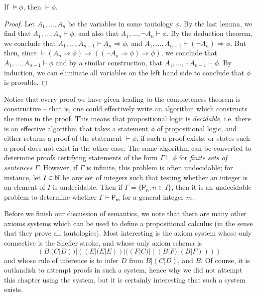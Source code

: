 \begin{corollary}
    If $\vDash \phi$, then $\vdash \phi$.
\end{corollary}
\begin{proof}
    Let $A_1, \dots, A_n$ be the variables in some tautology $\phi$. By the last lemma, we find that $A_1, \dots, A_n \vdash \phi$, and also that $A_1, \dots, \neg A_n \vdash \phi$. By the deduction theorem, we conclude that $A_1, \dots, A_{n-1} \vdash A_n \Rightarrow \phi$, and $A_1, \dots, A_{n-1} \vdash (\neg A_n) \Rightarrow \phi$. But then, since $\vdash (A_n \Rightarrow \phi) \Rightarrow ((\neg A_n \Rightarrow \phi) \Rightarrow \phi)$, we conclude that $A_1, \dots, A_{n-1} \vdash \phi$ and by a similar construction, that $A_1, \dots, \neg A_{n-1} \vdash \phi$. By induction, we can eliminate all variables on the left hand side to conclude that $\phi$ is provable.
\end{proof}

Notice that every proof we have given leading to the completeness theorem is constructive -- that is, one could effectively write an algorithm which constructs the items in the proof. This means that propositional logic is {\it decidable}, i.e. there is an effective algorithm that takes a statement $\phi$ of propositional logic, and either returns a proof of the statement $\vdash \phi$, if such a proof exists, or states such a proof does not exist in the other case. The same algorithm can be converted to determine proofs certifying statements of the form $\Gamma \vdash \phi$ for \emph{finite sets of sentences} $\Gamma$. However, if $\Gamma$ is infinite, this problem is often undecidable; for instance, let $I \subset \operatorname{\mathbb{N}}$ be any set of integers such that testing whether an integer is an element of $I$ is undecidable. Then if $\Gamma = \{ \mathsf{P_n} : n \in I \}$, then it is an undecidable problem to determine whether $\Gamma \vdash \mathsf{P_m}$ for a general integer $m$.

Before we finish our discussion of semantics, we note that there are many other axioms systems which can be used to define a propositional calculus (in the sense that they prove all tautologies). Most interesting is the axiom system whose only connective is the Sheffer stroke, and whose only axiom schema is
%
\[ (B|(C|D))|((E|(E|E))|((F|C)|((B|F)|(B|F)))) \]
%
and whose rule of inference is to infer $D$ from $B|(C|D)$, and $B$. Of course, it is outlandish to attempt proofs in such a system, hence why we did not attempt this chapter using the system, but it is certainly interesting that such a system exists.

